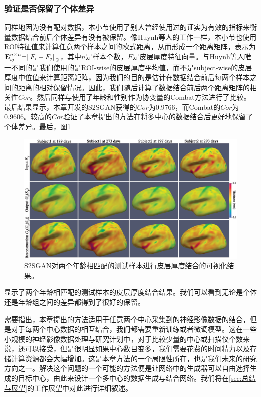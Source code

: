 \subsubsection{验证是否保留了个体差异}
同样地因为没有配对数据，本小节使用了别人曾经使用过的证实为有效的指标来衡量数据结合前后个体差异有没有被保留。像Huynh等人\cite{huynh2019multi}的工作一样，本小节也使用ROI特征值来计算任意两个样本之间的欧式距离，从而形成一个距离矩阵，表示为${\bf{E}}_{ij}^{n \times n}{\rm{ = }}{\left\| {{F_i} - {F_j}} \right\|_{\rm{2}}}$，其中$n$是样本个数，$F$是皮层厚度特征向量。与Huynh等人\cite{huynh2019multi}唯一不同的是我们使用的是ROI-wise的皮层厚度平均值，而不是subject-wise的皮层厚度中位值来计算距离矩阵，因为我们的目的是估计在数据结合前后每两个样本之间的距离的相对保留情况。因此，我们随后计算了数据结合前后两个距离矩阵的相关性$Cor$。然后同样与使用了年龄和性别作为协变量的Combat方法进行了比较。最后结果显示，本章开发的S2SGAN获得的$Cor$为0.9766，而Combat的$Cor$为0.9606。较高的$Cor$验证了本章提出的方法在将多中心的数据结合后更好地保留了个体差异。最后，图\ref{fig:s2sgan_examples}
\begin{figure}[h]
	\centering
	\includegraphics[width=\linewidth]{figure/s2sgan_examples.eps}
	\caption{S2SGAN对两个年龄相匹配的测试样本进行皮层厚度结合的可视化结果。}\label{fig:s2sgan_examples}
\end{figure}
显示了两个年龄相匹配的测试样本的皮层厚度结合结果。我们可以看到无论是个体还是年龄组之间的差异都得到了很好的保留。

需要指出，本章提出的方法适用于任意两个中心采集到的神经影像数据的结合，但是对于每两个中心数据的相互结合，我们都需要重新训练或者微调模型。这在一些小规模的神经影像数据处理与研究计划中，对于比较少量的中心或扫描仪个数来说，还可以接受，但是很明显如果中心数目变多，我们需要花费的时间精力以及存储计算资源都会大幅增加。这是本章方法的一个局限性所在，也是我们未来的研究方向之一。解决这个问题的一个可能的方法便是让网络中的生成器可以自由选择生成的目标中心，由此来设计一个多中心的数据生成与结合网络。我们将在\ref{sec:总结与展望}的工作展望中对此进行详细叙述。

